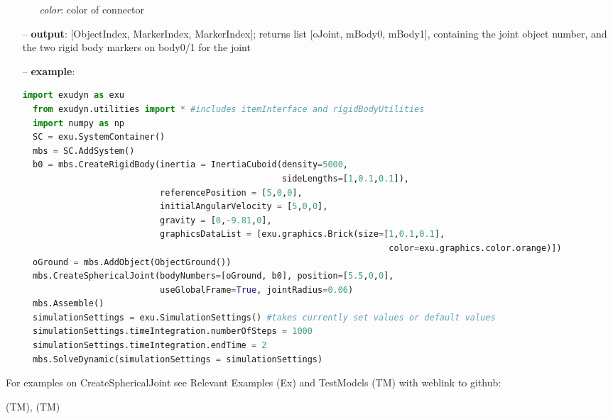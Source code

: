 \begin{itemize}[leftmargin=0.7cm]
\begin{itemize}[leftmargin=1.2cm]
\item[]{\it color}: color of connector
\end{itemize}
\item[--]
{\bf output}: [ObjectIndex, MarkerIndex, MarkerIndex]; returns list [oJoint, mBody0, mBody1], containing the joint object number, and the two rigid body markers on body0/1 for the joint
\item[--]
{\bf example}: \vspace{-12pt}\ei\begin{lstlisting}[language=Python, xleftmargin=36pt]
  import exudyn as exu
  from exudyn.utilities import * #includes itemInterface and rigidBodyUtilities
  import numpy as np
  SC = exu.SystemContainer()
  mbs = SC.AddSystem()
  b0 = mbs.CreateRigidBody(inertia = InertiaCuboid(density=5000,
                                                   sideLengths=[1,0.1,0.1]),
                           referencePosition = [5,0,0],
                           initialAngularVelocity = [5,0,0],
                           gravity = [0,-9.81,0],
                           graphicsDataList = [exu.graphics.Brick(size=[1,0.1,0.1],
                                                                        color=exu.graphics.color.orange)])
  oGround = mbs.AddObject(ObjectGround())
  mbs.CreateSphericalJoint(bodyNumbers=[oGround, b0], position=[5.5,0,0],
                           useGlobalFrame=True, jointRadius=0.06)
  mbs.Assemble()
  simulationSettings = exu.SimulationSettings() #takes currently set values or default values
  simulationSettings.timeIntegration.numberOfSteps = 1000
  simulationSettings.timeIntegration.endTime = 2
  mbs.SolveDynamic(simulationSettings = simulationSettings)
\end{lstlisting}\vspace{-24pt}\bi\item[]\vspace{-24pt}\vspace{12pt}\end{itemize}
%

%
\noindent For examples on CreateSphericalJoint see Relevant Examples (Ex) and TestModels (TM) with weblink to github:
\bi
 \item \footnotesize {} (TM), 
 (TM)
\ei

